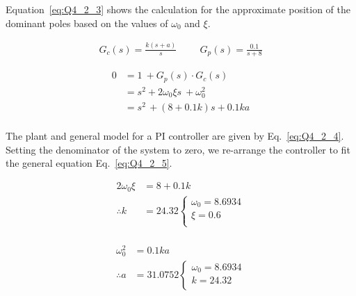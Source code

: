 Equation~\eqref{eq:Q4_2_3} shows the calculation for the approximate position of the dominant poles based on the values of $\omega_0$ and $\xi$.

    \begin{equation}
        \begin{split}
            G_{c}\left(s\right)=\frac{k\left(s+a\right)}{s} \hspace{1cm} G_{p}\left(s\right)=\frac{0.1}{s+8}
        \end{split}\label{eq:Q4_2_4}
    \end{equation}
    
    \begin{equation}
        \begin{split}
            0&=1\ +G_{p}\left(s\right)\cdot G_{c}\left(s\right)\\
            &=s^{2}+2\omega_{0}\xi s\ +\omega_{0}^{2}\\
            &=s^{2\ }+\left(8+0.1k\right)s+0.1ka\\
        \end{split}\label{eq:Q4_2_5}
    \end{equation}

    The plant and general model for a PI controller are given by Eq.~\eqref{eq:Q4_2_4}. Setting the denominator of the system to zero, we re-arrange the controller to fit the general equation Eq.~\eqref{eq:Q4_2_5}.

    \begin{equation}
        \begin{split}
            2\omega_{0}\xi &= 8+0.1k\\
            \therefore k &= 24.32
            \begin{cases}
                \omega_0 = 8.6934 \\
                \xi = 0.6 \\
            \end{cases}\\
        \end{split}\label{eq:Q4_2_6}
    \end{equation}
    
    \begin{equation}
        \begin{split}
            \omega_{0}^{2} &= 0.1ka\\
            \therefore a &= 31.0752    
            \begin{cases}
                \omega_0 = 8.6934 \\
                k = 24.32 \\
            \end{cases}
        \end{split}\label{eq:Q4_2_7}
    \end{equation}

